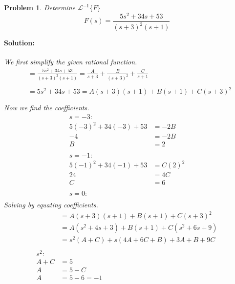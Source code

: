 \documentclass{article}
\newtheorem{problem}{Problem}
\begin{document}
    \begin{problem}
        Determine $\mathcal{L}^{-1}\{F\}$ 
        \[
            F(s) = \frac{5s^{2} + 34s + 53}{(s + 3)^{2}(s + 1)}
        \]
    \end{problem}
    \textbf{Solution:} \\ \\
    \textit{We first simplify the given rational function.} \\
    \begin{align*}
        &= \frac{5s^{2} + 34s + 53}{(s + 3)^{2}(s + 1)} = \frac{A}{s + 3} + \frac{B}{(s + 3)^{2}} + \frac{C}{s + 1} \\ \\
        &= 5s^{2} + 34s + 53 = A(s + 3)(s + 1) + B(s + 1) + C(s + 3)^{2} \\ \\
    \end{align*}
    \textit{Now we find the coefficients.} \\
    \begin{align*}
        s = -3: \\
        5(-3)^{2} + 34(-3) + 53 &= -2B \\
        -4 &= -2B \\
        B &= 2 \\ \\ 
        s = -1: \\
        5(-1)^{2} + 34(-1) + 53 &=  C(2)^{2} \\
        24 &= 4C \\
        C &= 6 \\ \\
        s = 0: \\
    \end{align*}
    \textit{Solving by equating coefficients.} \\
    \begin{align*}
        &=A(s + 3)(s + 1) + B(s + 1) + C(s + 3)^{2} \\
        &= A(s^{2} + 4s + 3) + B(s + 1) + C(s^{2} + 6s + 9) \\
        &= s^{2}(A + C) + s(4A + 6C + B) + 3A + B + 9C \\ \\
        s^{2}: \\
        A + C &= 5 \\
        A &= 5 - C \\ 
        A &= 5 - 6 = -1 \\ \\
    \end{align*} 
\end{document}
